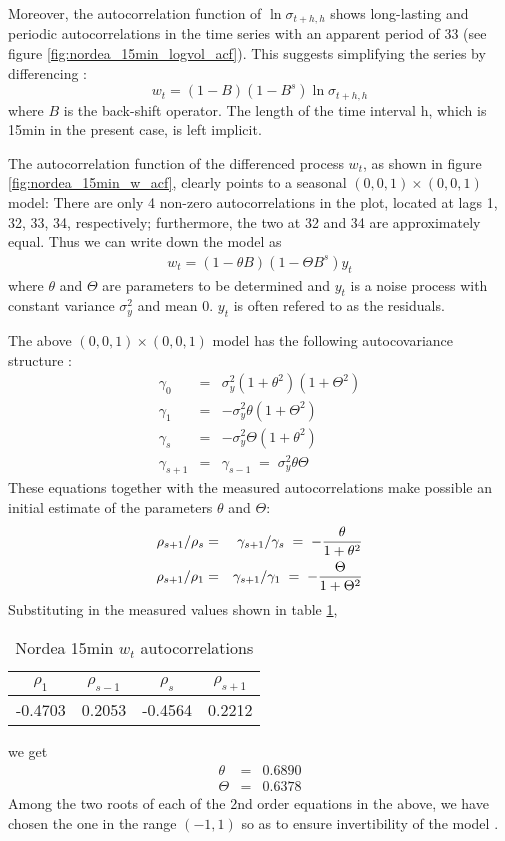 \documentclass{book}
\begin{document}
Moreover, the autocorrelation function of $\ln\sigma_{t+h, h}$
shows long-lasting and periodic autocorrelations in the time series
with an apparent period of 33 (see figure
\ref{fig:nordea_15min_logvol_acf}). This suggests simplifying the
series by differencing \cite{BoxJenkins94}:
\[
w_t = (1-B)(1-B^s)\ln\sigma_{t+h, h}
\]
where $B$ is the back-shift operator. The length of the time interval
h, which is 15min in the present case, is left implicit.

The autocorrelation function of the differenced process $w_t$, as shown in
figure \ref{fig:nordea_15min_w_acf}, clearly points to a seasonal $(0,
0, 1)\times(0, 0, 1)$ model: There are only 4 non-zero
autocorrelations in the plot, located at lags 1, 32, 33, 34,
respectively; furthermore, the two at 32 and 34 are approximately
equal. Thus we can write down the model as
\begin{eqnarray*}
  w_t = (1 - \theta B)(1 - \Theta B^s) y_t
\end{eqnarray*}
where $\theta$ and $\Theta$ are parameters to be determined and $y_t$
is a noise process with constant variance $\sigma_y^2$ and mean
0. $y_t$ is often refered to as the residuals.

The above $(0, 0, 1)\times(0, 0, 1)$ model has the following
autocovariance structure \cite{BoxJenkins94}:
\begin{eqnarray*}
  \gamma_0 &=& \sigma_y^2 (1 + \theta^2)(1 + \Theta^2) \\
  \gamma_1 &=& -\sigma_y^2\theta(1 + \Theta^2) \\
  \gamma_s &=& -\sigma_y^2\Theta(1 + \theta^2) \\
  \gamma_{s+1} &=& \gamma_{s-1}\;=\;\sigma_y^2\theta\Theta
\end{eqnarray*}
These equations together with the measured autocorrelations make
possible an initial estimate of the parameters $\theta$ and $\Theta$:
\begin{eqnarray*}
  {\rho_{s+1}/\rho_s} &=& {\gamma_{s+1}/\gamma_s} \;=\; -{\theta \over
    1 + \theta^2} \\
  {\rho_{s+1}/\rho_1} &=& {\gamma_{s+1}/\gamma_1} \;=\; -{\Theta \over
    1 + \Theta^2} \\
\end{eqnarray*}
Substituting in the measured values shown in table
\ref{tab:nordea_15min_w_acf},
\begin{table}[htb!]
  \centering
  \begin{tabular}{c|c|c|c}
    $\rho_1$ & $\rho_{s-1}$ & $\rho_s$ & $\rho_{s+1}$ \\
    \hline
    -0.4703 &  0.2053 & -0.4564 &  0.2212
  \end{tabular}
  \caption{Nordea 15min $w_t$ autocorrelations}
  \label{tab:nordea_15min_w_acf}
\end{table}
we get
\begin{eqnarray*}
  \theta &=& 0.6890 \\
  \Theta &=& 0.6378
\end{eqnarray*}
Among the two roots of each of the 2nd order equations in the above,
we have chosen the one in the range $(-1, 1)$ so as to ensure
invertibility of the model \cite{BoxJenkins94}.
\end{document}
